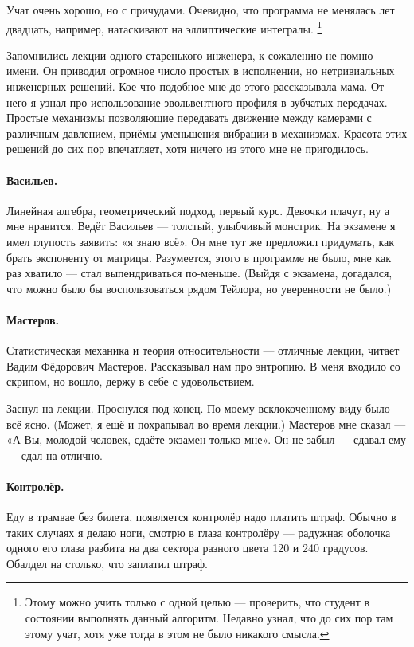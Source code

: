 \documentclass{book}
\begin{document}
Учат очень хорошо, но с причудами.
Очевидно, что программа не менялась лет двадцать,
например, натаскивают на эллиптические интегралы.%
\footnote{Этому можно учить только с одной целью --- проверить, что студент в состоянии выполнять данный алгоритм.
Недавно узнал, что до сих пор там этому учат, хотя уже тогда в этом не было никакого смысла.}

Запомнились лекции одного старенького инженера, к сожалению не помню имени.
Он приводил огромное число простых в исполнении, но нетривиальных инженерных решений.
Кое-что подобное мне до этого рассказывала мама.
От него я узнал про использование эвольвентного профиля в зубчатых передачах.
Простые механизмы позволяющие передавать движение между камерами с различным давлением, приёмы уменьшения вибрации в механизмах.
Красота этих решений до сих пор впечатляет, хотя ничего из этого мне не пригодилось.

\paragraph{Васильев.}
Линейная алгебра, 
геометрический подход, 
первый курс. 
Девочки плачут, ну а мне нравится.
Ведёт Васильев --- толстый, улыбчивый монстрик.
На экзамене я имел глупость заявить: «я знаю всё».
Он мне тут же предложил придумать, как брать экспоненту от матрицы.
Разумеется, этого в программе не было,
мне как раз хватило --- стал выпендриваться по-меньше.
(Выйдя с экзамена, догадался, что можно было бы воспользоваться рядом Тейлора, но уверенности не было.)

\paragraph{Мастеров.}
Статистическая механика и теория относительности --- отличные лекции, читает Вадим Фёдорович Мастеров.
Рассказывал нам про энтропию. 
В меня входило со скрипом, 
но вошло, держу в себе с удовольствием.

Заснул на лекции.
Проснулся под конец.
По моему всклокоченному виду было всё ясно.
(Может, я ещё и похрапывал во время лекции.)
Мастеров мне сказал --- «А Вы, молодой человек, сдаёте экзамен только мне».
Он не забыл --- сдавал ему --- сдал на отлично.

\paragraph{Контролёр.}
Еду в трамвае без билета,
появляется контролёр надо платить штраф.
Обычно в таких случаях я делаю ноги,
смотрю в глаза контролёру --- радужная оболочка одного его глаза разбита на два сектора разного цвета
120 и 240 градусов.
Обалдел на столько, что заплатил штраф.
\end{document}
